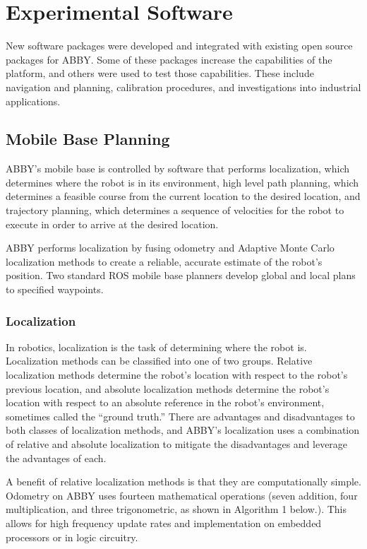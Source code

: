 \documentclass[]{cwru} %
\begin{document}
\chapter{Experimental Software}

New software packages were developed
and integrated with existing open source packages for ABBY. Some of
these packages increase the capabilities of the platform, and others
were used to test those capabilities. These include navigation and
planning, calibration procedures, and investigations into industrial
applications.

\section{Mobile Base Planning}


ABBY's mobile base is controlled by software that performs localization,
which determines where the robot is in its environment, high level path
planning, which determines a feasible course from the current location
to the desired location, and trajectory planning, which determines a
sequence of velocities for the robot to execute in order to arrive at
the desired location.

ABBY performs localization by fusing odometry and Adaptive Monte Carlo
localization methods to create a reliable, accurate estimate of the
robot's position. Two standard ROS mobile base planners develop global
and local plans to specified
waypoints.

\subsection{Localization}
\label{localization}

In robotics, localization is the task of determining where the robot is.
Localization methods can be classified into one of two groups. Relative
localization methods determine the robot's location with respect to the
robot's previous location, and absolute localization methods determine
the robot's location with respect to an absolute reference in the
robot's environment, sometimes called the ``ground truth.'' There are
advantages and disadvantages to both classes of localization methods,
and ABBY's localization uses a combination of relative and absolute
localization to mitigate the disadvantages and leverage the advantages
of each.

A benefit of relative localization methods is that they are
computationally simple. Odometry on ABBY uses fourteen mathematical
operations (seven addition, four multiplication, and three
trigonometric, as shown in Algorithm 1 below.). This allows for high
frequency update rates and implementation on embedded processors or in
logic circuitry.
\end{document}
